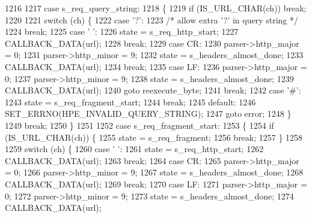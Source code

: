 \begin{DoxyCode}
1216 
1217       \textcolor{keywordflow}{case} s_req_query_string:
1218       \{
1219         \textcolor{keywordflow}{if} (IS_URL_CHAR(ch)) \textcolor{keywordflow}{break};
1220 
1221         \textcolor{keywordflow}{switch} (ch) \{
1222           \textcolor{keywordflow}{case} \textcolor{charliteral}{'?'}:
1223             \textcolor{comment}{/* allow extra '?' in query string */}
1224             \textcolor{keywordflow}{break};
1225           \textcolor{keywordflow}{case} \textcolor{charliteral}{' '}:
1226             state = s_req_http_start;
1227             CALLBACK_DATA(url);
1228             \textcolor{keywordflow}{break};
1229           \textcolor{keywordflow}{case} CR:
1230             parser->http_major = 0;
1231             parser->http_minor = 9;
1232             state = s_headers_almost_done;
1233             CALLBACK_DATA(url);
1234             \textcolor{keywordflow}{break};
1235           \textcolor{keywordflow}{case} LF:
1236             parser->http_major = 0;
1237             parser->http_minor = 9;
1238             state = s_headers_almost_done;
1239             CALLBACK_DATA(url);
1240             \textcolor{keywordflow}{goto} reexecute\_byte;
1241             \textcolor{keywordflow}{break};
1242           \textcolor{keywordflow}{case} \textcolor{charliteral}{'#'}:
1243             state = s_req_fragment_start;
1244             \textcolor{keywordflow}{break};
1245           \textcolor{keywordflow}{default}:
1246             SET_ERRNO(HPE_INVALID_QUERY_STRING);
1247             \textcolor{keywordflow}{goto} error;
1248         \}
1249         \textcolor{keywordflow}{break};
1250       \}
1251 
1252       \textcolor{keywordflow}{case} s_req_fragment_start:
1253       \{
1254         \textcolor{keywordflow}{if} (IS_URL_CHAR(ch)) \{
1255           state = s_req_fragment;
1256           \textcolor{keywordflow}{break};
1257         \}
1258 
1259         \textcolor{keywordflow}{switch} (ch) \{
1260           \textcolor{keywordflow}{case} \textcolor{charliteral}{' '}:
1261             state = s_req_http_start;
1262             CALLBACK_DATA(url);
1263             \textcolor{keywordflow}{break};
1264           \textcolor{keywordflow}{case} CR:
1265             parser->http_major = 0;
1266             parser->http_minor = 9;
1267             state = s_headers_almost_done;
1268             CALLBACK_DATA(url);
1269             \textcolor{keywordflow}{break};
1270           \textcolor{keywordflow}{case} LF:
1271             parser->http_major = 0;
1272             parser->http_minor = 9;
1273             state = s_headers_almost_done;
1274             CALLBACK_DATA(url);

\end{DoxyCode}
